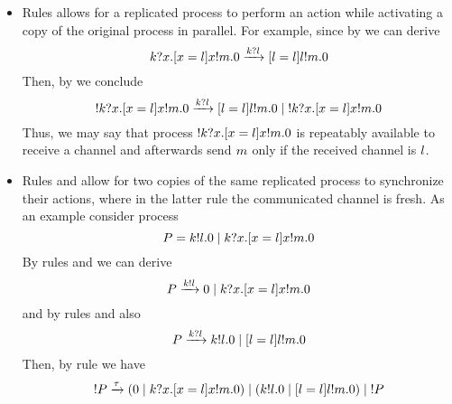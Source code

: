 \begin{itemize}
%
%
\item Rules  allows for a replicated process to perform an action while activating a copy of the original process in parallel.
For example, since by  we can derive 
\[
k?x.[ x = l ]x!m.0
\xrightarrow{k?l}
[ l = l ]l!m.0
\]
Then, by  we conclude
\[
! k?x.[ x = l ]x!m.0
\xrightarrow{k?l}
[ l = l ]l!m.0 \;|\; ! k?x.[ x = l ]x!m.0
\]
Thus, we may say that process $! k?x.[ x = l ]x!m.0$ 
is repeatably available to receive a channel and afterwards send $m$ only if the received  channel is $l$.
%
\item Rules  and  allow for two copies of the same replicated process to synchronize their actions, where in the latter rule the communicated channel is fresh. 
As an example consider process 
\[
P=k!l.0 \;|\; k?x.[ x = l ]x!m.0\]
By rules  and  we can derive 
\[
P
\xrightarrow{k!l}
0 \;|\; k?x.[ x = l ]x!m.0
\]
and by rules  and  also
\[
P
\xrightarrow{k?l}
k!l.0 \;|\; [ l = l ]l!m.0
\]
Then, by rule  we have 
\[
! P
\xrightarrow{\tau}
(0 \;|\; k?x.[ x = l ]x!m.0) \;|\; (k!l.0 \;|\; [ l = l ]l!m.0) \;|\; ! P
\]
%
%
%


\end{itemize}
